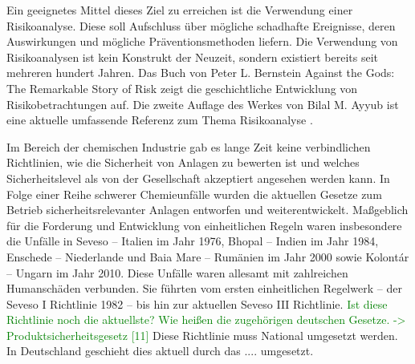Ein geeignetes Mittel dieses Ziel zu erreichen ist die Verwendung einer Risikoanalyse. Diese soll Aufschluss \"uber m\"ogliche schadhafte Ereignisse, deren Auswirkungen und m\"ogliche Pr\"aventionsmethoden liefern. Die Verwendung von Risikoanalysen ist kein Konstrukt der Neuzeit, sondern existiert bereits seit mehreren hundert Jahren. Das Buch von Peter L. Bernstein \glqq Against the Gods: The Remarkable Story of Risk\grqq { } \cite{Bernstein_1998} zeigt die geschichtliche Entwicklung von Risikobetrachtungen auf. Die zweite Auflage des Werkes von Bilal M. Ayyub ist eine aktuelle umfassende Referenz zum Thema Risikoanalyse \cite{Ayyub_2014}. \hfill \newline

Im Bereich der chemischen Industrie gab es lange Zeit keine verbindlichen Richtlinien, wie die Sicherheit von Anlagen zu bewerten ist und welches Sicherheitslevel als von der Gesellschaft akzeptiert angesehen werden kann. In Folge einer Reihe schwerer Chemieunf\"alle wurden die aktuellen Gesetze zum Betrieb sicherheitsrelevanter Anlagen entworfen und weiterentwickelt.\hfill \newline
Ma\ss{}geblich f\"ur die Forderung und Entwicklung von einheitlichen Regeln waren insbesondere die Unf\"alle in Seveso -- Italien im Jahr 1976, Bhopal -- Indien im Jahr 1984, Enschede -- Niederlande und Baia Mare -- Rum\"anien im Jahr 2000 sowie Kolont\'ar -- Ungarn im Jahr 2010. Diese Unf\"alle waren allesamt mit zahlreichen Humansch\"aden verbunden. Sie f\"uhrten vom ersten einheitlichen Regelwerk -- der Seveso I Richtlinie 1982 -- bis hin zur aktuellen Seveso III Richtlinie. \textcolor{green}{Ist diese Richtlinie noch die aktuellste? Wie hei\ss{}en die zugeh\"origen deutschen Gesetze. -> Produktsicherheitsgesetz [11]} Diese Richtlinie muss National umgesetzt werden. In Deutschland geschieht dies aktuell durch das .... umgesetzt. \hfill \newline

